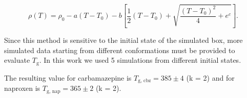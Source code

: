 \begin{equation}\label{eq:fit}
	\rho(T)=\rho_0-a\left(T-T_0\right)-b\left[\frac{1}{2}\left(T-T_0\right)+\sqrt{\frac{\left(T-T_0\right)^2}{4}+e^c}\right].
\end{equation}

Since this method is sensitive to the initial state of the simulated box, more simulated data starting from different conformations must be provided to evaluate $T_\text{g}$. In this work we used 5 simulations from different initial states.

The resulting value for carbamazepine is $T_{\text{g, cbz}} = 385 \pm 4$ (k = 2) and for naproxen is $T_{\text{g, nap}} = 365 \pm 2$ (k = 2). 

